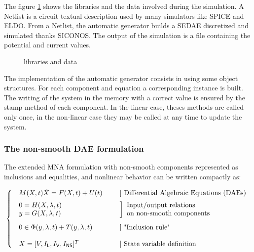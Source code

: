 The figure \ref{fig-soft-aspect} shows the libraries and the data involved during the simulation. A
Netlist is a circuit textual description used by many simulators like SPICE and ELDO. From a Netlist, the automatic generator builds a SEDAE discretized and simulated thanks
SICONOS. The output of the simulation is a file containing the potential and current values.

\begin{figure}[h]
\centerline{
 \scalebox{0.9}{
    
 }
}
\caption{libraries and data}
\label{fig-soft-aspect}
\end{figure}

The implementation of the automatic generator consists in using some object structures. For each component
and equation a corresponding instance is built. The writing of the system in the memory with a correct value is ensured by the stamp method of each component. In the linear
case, theses methods are called only once, in the non-linear case they may be called at any time to update the system.


\subsubsection{The non-smooth DAE formulation}


The extended MNA formulation with non-smooth components represented as inclusions and equalities, and nonlinear behavior can  be written compactly as:

\begin{equation}
  \label{eq:71}
 \left\{ \begin{array}{l l l}
    \begin{array}{l}
  M(X,t) \dot X = F(X,t) + U(t)
\end{array}
& & ]\text{ Differential Algebraic Equations (DAEs)}\\[2mm]
  \begin{array}{l}
    0 = H(X,\lambda,t)\\
    y = G(X,\lambda,t) 
  \end{array} &  & \bigg]\begin{array}{l}
   \text{Input/output relations }\\
   \text{on non-smooth components}
  \end{array}  \\[5mm]
  \begin{array}{l}
  0 \in \Phi(y,\lambda,t) + T(y,\lambda,t)
\end{array}
&  & ] \text{ "Inclusion rule"}\\ \\
 \begin{array}{l}X =[V,I_{\mathsf L}, I_{\mathsf V}, I_{\mathsf{NS}}]^T
 \end{array}
 & &] \text{ State variable definition}\\
\end{array}\right.
\end{equation}


